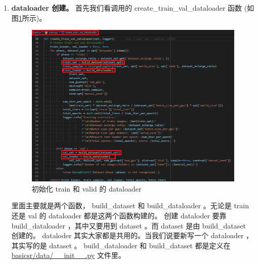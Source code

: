 \documentclass[../main.tex]{subfiles}
\begin{document}
\begin{enumerate}

    \item \textbf{dataloader 创建。}
          首先我们看调用的 create\_train\_val\_dataloader 函数 (如图\ref{fig:getting_start_init_dataloader}所示)。

          \begin{figure}[h]
              \begin{center}
                  \vspace{-0.2cm}
                  \includegraphics[width=0.85\linewidth]{figures/getting_start_init_dataloader.png}
                  \vspace{-0.2cm}
                  \caption{初始化 train 和 valid 的 dataloader}
                  \label{fig:getting_start_init_dataloader}
              \end{center}
              \vspace{-0.5cm}
          \end{figure}

          里面主要就是两个函数， build\_dataset 和 build\_dataloader 。无论是 train 还是 val 的 dataloader 都是这两个函数构建的。
          创建 dataloder 要靠 build\_dataloader ，其中又要用到 dataset 。而 dataset 是由 build\_dataset 创建的。 dataloder 其实大家都是共用的。当我们说要新写一个 dataloader ，其实写的是 dataset 。 build\_dataloader 和 build\_dataset 都是定义在 \href{https://github.com/XPixelGroup/BasicSR/blob/master/basicsr/data/\_\_init\_\_.py}{basicsr/data/\_\_init\_\_.py} 文件里。


\end{enumerate}
\end{document}
